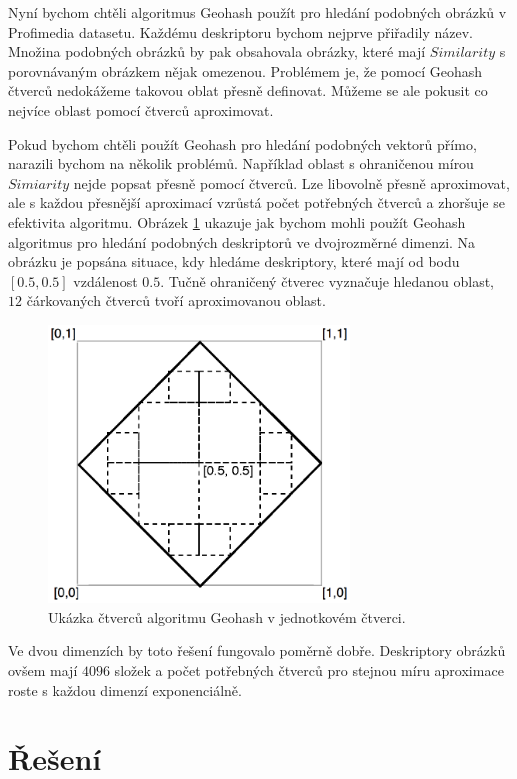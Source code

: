 Nyní bychom chtěli algoritmus Geohash použít pro hledání podobných obrázků v Profimedia datasetu. Každému deskriptoru bychom nejprve přiřadily název. Množina podobných obrázků by pak obsahovala obrázky, které mají $Similarity$ s porovnávaným obrázkem nějak omezenou. Problémem je, že pomocí Geohash čtverců nedokážeme takovou oblat přesně definovat. Můžeme se ale pokusit co nejvíce oblast pomocí čtverců aproximovat. 

Pokud bychom chtěli použít Geohash pro hledání podobných vektorů přímo, narazili bychom na několik problémů. Například oblast s ohraničenou mírou $Simiarity$ nejde popsat přesně pomocí čtverců. Lze libovolně přesně aproximovat, ale s každou přesnější aproximací vzrůstá počet potřebných čtverců a zhoršuje se efektivita algoritmu. Obrázek \ref{fig:geohash_use} ukazuje jak bychom mohli použít Geohash algoritmus pro hledání podobných deskriptorů ve dvojrozměrné dimenzi. Na obrázku je popsána situace, kdy hledáme deskriptory, které mají od bodu $[0.5, 0.5]$ vzdálenost $0.5$. Tučně ohraničený čtverec vyznačuje hledanou oblast, $12$ čárkovaných čtverců tvoří aproximovanou oblast.

\begin{figure}[h]
  \centering
  \includegraphics[width=80mm]{geohash_use.eps}
  \caption{Ukázka čtverců algoritmu Geohash v jednotkovém čtverci.}
  \label{fig:geohash_use}
\end{figure}

Ve dvou dimenzích by toto řešení fungovalo poměrně dobře. Deskriptory obrázků ovšem mají $4096$ složek a počet potřebných čtverců pro stejnou míru aproximace roste s každou dimenzí exponenciálně.

\section{Řešení}


